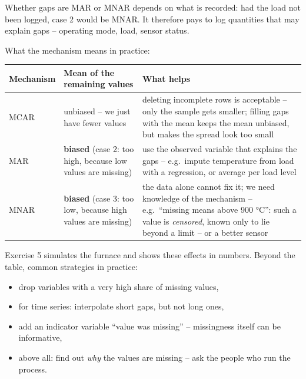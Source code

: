 \documentclass[
  letterpaper,
  DIV=11,
  numbers=noendperiod]{scrreprt}
\providecommand{\tightlist}{%
  \setlength{\itemsep}{0pt}\setlength{\parskip}{0pt}}\usepackage{longtable,booktabs,array}
\begin{document}
Whether gaps are MAR or MNAR depends on what is recorded: had the load
not been logged, case 2 would be MNAR. It therefore pays to log
quantities that may explain gaps -- operating mode, load, sensor status.

What the mechanism means in practice:

\begin{longtable}[]{@{}
  >{\raggedright\arraybackslash}p{}
  >{\raggedright\arraybackslash}p{}
  >{\raggedright\arraybackslash}p{}@{}}
\toprule\noalign{}
\begin{minipage}[b]{\linewidth}\raggedright
Mechanism
\end{minipage} & \begin{minipage}[b]{\linewidth}\raggedright
Mean of the remaining values
\end{minipage} & \begin{minipage}[b]{\linewidth}\raggedright
What helps
\end{minipage} \\
\midrule\noalign{}
\endhead
\bottomrule\noalign{}
\endlastfoot
MCAR & unbiased -- we just have fewer values & deleting incomplete rows
is acceptable -- only the sample gets smaller; filling gaps with the
mean keeps the mean unbiased, but makes the spread look too small \\
MAR & \textbf{biased} (case 2: too high, because low values are missing)
& use the observed variable that explains the gaps -- e.g.~impute
temperature from load with a regression, or average per load level \\
MNAR & \textbf{biased} (case 3: too low, because high values are
missing) & the data alone cannot fix it; we need knowledge of the
mechanism -- e.g.~``missing means above 900 °C'': such a value is
\emph{censored}, known only to lie beyond a limit -- or a better
sensor \\
\end{longtable}

Exercise 5 simulates the furnace and shows these effects in numbers.
Beyond the table, common strategies in practice:

\begin{itemize}
\tightlist
\item
  drop variables with a very high share of missing values,
\item
  for time series: interpolate short gaps, but not long ones,
\item
  add an indicator variable ``value was missing'' -- missingness itself
  can be informative,
\item
  above all: find out \emph{why} the values are missing -- ask the
  people who run the process.
\end{itemize}
\end{document}
